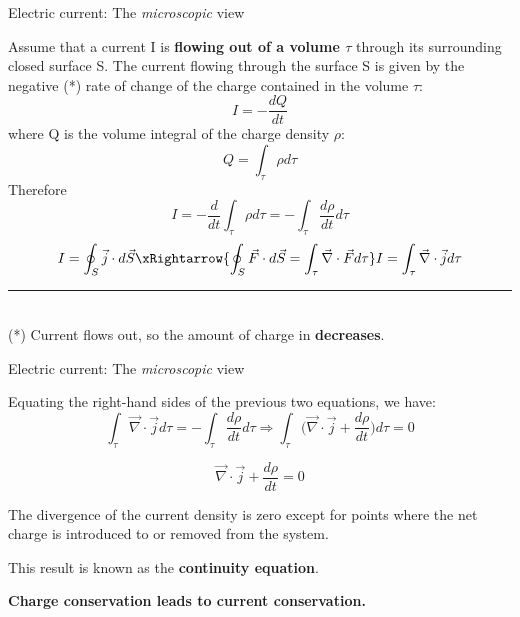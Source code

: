 \begin{frame}{Electric current: The {\em microscopic} view }

Assume that a current I is {\bf flowing out of a volume $\tau$}
through its surrounding closed surface S.
The current flowing through the surface S is given by the negative (*)
rate of change of the charge contained in the volume $\tau$:
\begin{equation*}
   I = - \frac{dQ}{dt}
\end{equation*}
where Q is the volume integral of the charge density $\rho$:
\begin{equation*}
   Q = \int_{\tau} \rho d\tau
\end{equation*}
Therefore
\begin{equation*}
   I = - \frac{d}{dt} \int_{\tau} \rho d\tau = - \int_{\tau} \frac{d\rho}{dt} d\tau
\end{equation*}
\begin{equation*}
   I = \oint_{S} \vec{j} \cdot d\vec{S}
     \xRightarrow{\oint_{S} \vec{F} \cdot d\vec{S} = \int_{\tau} \vec{\nabla} \cdot \vec{F} d\tau}
   I = \int_{\tau} \vec{\nabla} \cdot \vec{j} d\tau
\end{equation*}

\noindent\rule{2cm}{0.4pt}\\
{\scriptsize
 (*) Current flows out, so the amount of charge in {\bf decreases}.\\
}

\end{frame}

%
%
%

\begin{frame}{Electric current: The {\em microscopic} view }

Equating the right-hand sides of the previous two equations, we have:
\begin{equation*}
  \int_{\tau} \vec{\nabla} \cdot \vec{j} d\tau = - \int_{\tau} \frac{d\rho}{dt} d\tau \Rightarrow
  \int_{\tau} \Big( \vec{\nabla} \cdot \vec{j} +\frac{d\rho}{dt} \Big) d\tau = 0
\end{equation*}

\begin{equation*}
    \vec{\nabla} \cdot \vec{j} +\frac{d\rho}{dt} = 0
\end{equation*}

\vspace{0.2cm}

The divergence of the current density is zero except for points where the
net charge is introduced to or removed from the system.\\

\vspace{0.2cm}

This result is known as the {\bf continuity equation}.\\

\vspace{0.2cm}

{\bf Charge conservation leads to current conservation.}\\

\end{frame}


